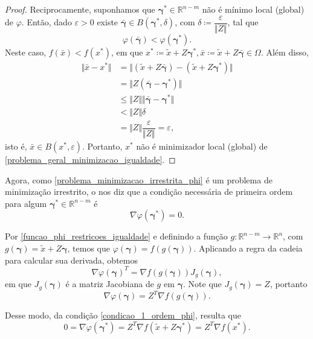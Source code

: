\documentclass[12pt,a4paper]{scrartcl}
\def\RR{\mathds{R}}
\def\xbar{\bar{x}}
\theoremstyle{definition}%
\begin{document}
\begin{proof}
Reciprocamente, suponhamos que $\boldsymbol{\gamma}^{*} \in \RR^{n-m}$ não é mínimo local (global) de $\varphi$. Então, dado $\varepsilon >0$ existe $\boldsymbol{\bar{\gamma}} \in B(\boldsymbol{\gamma}^{*} , \delta )$, com $\delta \coloneqq \dfrac{\varepsilon}{\Vert Z\Vert}$, tal que 
\[ \label{eq:1_prop:equivalencia_problema_restricoes_igualdade_irrestrito}
\varphi(\boldsymbol{\bar{\gamma}}) < \varphi({\boldsymbol{\gamma}^{*}}) .
\]
Neste caso, $f(\xbar) < f(x^{*})$, em que $x^{*} \coloneqq \tilde{x} + Z\boldsymbol{\gamma}^{*}, \xbar \coloneqq \tilde{x} + Z\boldsymbol{\bar{\gamma}} \in \Omega $. Além disso,
\[
\begin{aligned}
\Vert \xbar -x^{*} \Vert &= \Vert (\tilde{x} + Z\boldsymbol{\bar{\gamma}}) - (\tilde{x} + Z\boldsymbol{\gamma}^{*}) \Vert \\
&= \Vert Z(\boldsymbol{\bar{\gamma}} - \boldsymbol{\gamma}^{*} )\Vert \\
&\leq \Vert Z\Vert \Vert \boldsymbol{\bar{\gamma}} - \boldsymbol{\gamma}^{*} \Vert \\
&< \Vert Z\Vert \delta \\
&= \Vert Z\Vert \dfrac{\varepsilon}{\Vert Z \Vert} = \varepsilon , 
\end{aligned}
\]
isto é, $\xbar \in B(x^{*} , \varepsilon )$. Portanto, $x^{*}$ não é minimizador local (global) de \eqref{problema_geral_minimizacao_igualdade}.
\end{proof}

Agora, como \eqref{problema_minimizacao_irrestrita_phi} é um problema de minimização irrestrito, o  nos diz que a condição necessária de primeira ordem para algum $\boldsymbol{\gamma}^{*} \in \RR^{n-m}$ é
\[ \label{condicao_1_ordem_phi}
\nabla \varphi(\boldsymbol{\gamma}^{*}) = 0.
\]

Por \eqref{funcao_phi_restricoes_igualdade} e definindo a função $g: \RR^{n-m} \rightarrow \RR^{n}$, com $g(\boldsymbol{\gamma}) = \tilde{x} + Z\boldsymbol{\gamma}$, temos que $\varphi(\boldsymbol{\gamma}) = f(g(\boldsymbol{\gamma}))$. Aplicando a regra da cadeia para calcular sua derivada, obtemos
\[
\nabla \varphi (\boldsymbol{\gamma})^{T} = \nabla f(g(\boldsymbol{\gamma})) J_{g}(\boldsymbol{\gamma}) ,
\]
em que $J_{g}(\boldsymbol{\gamma})$ é a matriz Jacobiana de $g$ em $\boldsymbol{\gamma}$. Note que $J_{g}(\boldsymbol{\gamma}) = Z$, portanto
\[
\nabla \varphi(\boldsymbol{\gamma}) = Z^{T}\nabla f(g(\boldsymbol{\gamma})) .
\]

Desse modo, da condição \eqref{condicao_1_ordem_phi}, resulta que
\[
0 = \nabla \varphi (\boldsymbol{\gamma}^{*}) = Z^{T} \nabla f(\tilde{x} + Z\boldsymbol{\gamma}^{*}) = Z^{T} \nabla f(x^{*}).
\]
\end{document}
